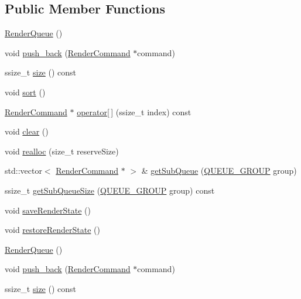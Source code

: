 \subsection*{Public Member Functions}
\begin{DoxyCompactItemize}
\item 
\hyperlink{classRenderQueue_ae893f8a1ae83c2e55e85378ed92fd5b9}{Render\+Queue} ()
\item 
void \hyperlink{classRenderQueue_adedac420d661ed5b32a8f47d9f6c842b}{push\+\_\+back} (\hyperlink{classRenderCommand}{Render\+Command} $\ast$command)
\item 
ssize\+\_\+t \hyperlink{classRenderQueue_aadadee1f1d53d85fa2d91cad921652e4}{size} () const
\item 
void \hyperlink{classRenderQueue_a5dce2ab80620ec15c36ccdf2da1fd87a}{sort} ()
\item 
\hyperlink{classRenderCommand}{Render\+Command} $\ast$ \hyperlink{classRenderQueue_ac5131e58ffb15d488fb752fb4a6fa791}{operator\mbox{[}$\,$\mbox{]}} (ssize\+\_\+t index) const
\item 
void \hyperlink{classRenderQueue_a8f4c44eedd6d9cc788100022ed725568}{clear} ()
\item 
void \hyperlink{classRenderQueue_a6a9e1c224b1c5d3c7ac92f9a3e14f23c}{realloc} (size\+\_\+t reserve\+Size)
\item 
std\+::vector$<$ \hyperlink{classRenderCommand}{Render\+Command} $\ast$ $>$ \& \hyperlink{classRenderQueue_af6486c291c439094adcd12d197a8f200}{get\+Sub\+Queue} (\hyperlink{classRenderQueue_a546a6ca0aa906f2fd8f86c698c76854e}{Q\+U\+E\+U\+E\+\_\+\+G\+R\+O\+UP} group)
\item 
ssize\+\_\+t \hyperlink{classRenderQueue_a0e2d32f2bb26fac3c08b6a7e8d827b04}{get\+Sub\+Queue\+Size} (\hyperlink{classRenderQueue_a546a6ca0aa906f2fd8f86c698c76854e}{Q\+U\+E\+U\+E\+\_\+\+G\+R\+O\+UP} group) const
\item 
void \hyperlink{classRenderQueue_a69e89af620d29b96de300710c39ea293}{save\+Render\+State} ()
\item 
void \hyperlink{classRenderQueue_a232643cb44bd75fd6ebdc5ef85ad4460}{restore\+Render\+State} ()
\item 
\hyperlink{classRenderQueue_ae893f8a1ae83c2e55e85378ed92fd5b9}{Render\+Queue} ()
\item 
void \hyperlink{classRenderQueue_adedac420d661ed5b32a8f47d9f6c842b}{push\+\_\+back} (\hyperlink{classRenderCommand}{Render\+Command} $\ast$command)
\item 
ssize\+\_\+t \hyperlink{classRenderQueue_aadadee1f1d53d85fa2d91cad921652e4}{size} () const

\end{DoxyCompactItemize}
